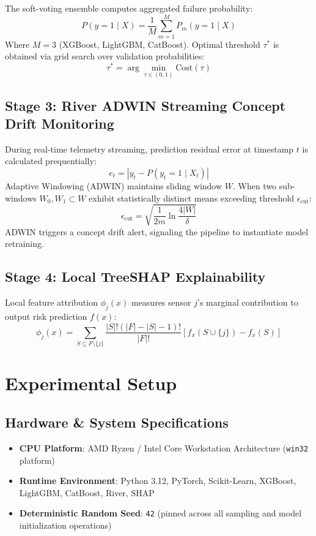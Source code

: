 \documentclass[journal]{IEEEtran}
\begin{document}
The soft-voting ensemble computes aggregated failure probability:
\begin{equation}
P(y=1 \mid X) = \frac{1}{M} \sum_{m=1}^{M} P_m(y=1 \mid X)
\end{equation}
Where $M=3$ (XGBoost, LightGBM, CatBoost). Optimal threshold $\tau^*$ is obtained via grid search over validation probabilities:
\begin{equation}
\tau^* = \arg\min_{\tau \in (0,1)} \text{Cost}(\tau)
\end{equation}

\subsection{Stage 3: River ADWIN Streaming Concept Drift Monitoring}
During real-time telemetry streaming, prediction residual error at timestamp $t$ is calculated prequentially:
\begin{equation}
e_t = | y_t - P(y_t=1 \mid X_t) |
\end{equation}
Adaptive Windowing (ADWIN) maintains sliding window $W$. When two sub-windows $W_0, W_1 \subset W$ exhibit statistically distinct means exceeding threshold $\epsilon_{\text{cut}}$:
\begin{equation}
\epsilon_{\text{cut}} = \sqrt{\frac{1}{2m} \ln \frac{4 |W|}{\delta}}
\end{equation}
ADWIN triggers a concept drift alert, signaling the pipeline to instantiate model retraining.

\subsection{Stage 4: Local TreeSHAP Explainability}
Local feature attribution $\phi_j(x)$ measures sensor $j$'s marginal contribution to output risk prediction $f(x)$:
\begin{equation}
\phi_j(x) = \sum_{S \subseteq F \setminus \{j\}} \frac{|S|! (|F| - |S| - 1)!}{|F|!} \left[ f_x(S \cup \{j\}) - f_x(S) \right]
\end{equation}

\section{Experimental Setup}

\subsection{Hardware \& System Specifications}
\begin{itemize}
    \item \textbf{CPU Platform}: AMD Ryzen / Intel Core Workstation Architecture (\texttt{win32} platform)
    \item \textbf{Runtime Environment}: Python 3.12, PyTorch, Scikit-Learn, XGBoost, LightGBM, CatBoost, River, SHAP
    \item \textbf{Deterministic Random Seed}: \texttt{42} (pinned across all sampling and model initialization operations)
\end{itemize}
\end{document}
